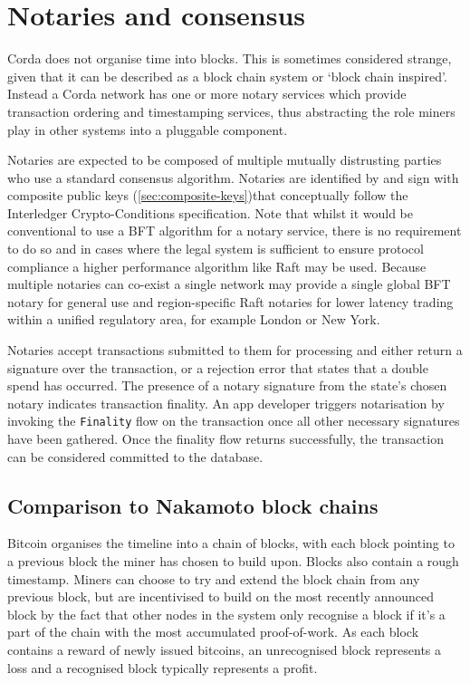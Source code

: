 \documentclass{article}
\begin{document}

\section{Notaries and consensus}\label{sec:notaries}

Corda does not organise time into blocks. This is sometimes considered strange, given that it can be described as a
block chain system or `block chain inspired'. Instead a Corda network has one or more notary services which provide
transaction ordering and timestamping services, thus abstracting the role miners play in other systems into a pluggable
component.

Notaries are expected to be composed of multiple mutually distrusting parties who use a standard consensus algorithm.
Notaries are identified by and sign with composite public keys (\cref{sec:composite-keys})that conceptually follow the
Interledger Crypto-Conditions specification\cite{ILPCC}. Note that whilst it would be conventional to use a BFT
algorithm for a notary service, there is no requirement to do so and in cases where the legal system is sufficient to
ensure protocol compliance a higher performance algorithm like Raft\cite{Ongaro:2014:SUC:2643634.2643666} may be used.
Because multiple notaries can co-exist a single network may provide a single global BFT notary for general use and
region-specific Raft notaries for lower latency trading within a unified regulatory area, for example London or New York.

Notaries accept transactions submitted to them for processing and either return a signature over the transaction, or
a rejection error that states that a double spend has occurred. The presence of a notary signature from the state's
chosen notary indicates transaction finality. An app developer triggers notarisation by invoking the
\texttt{Finality} flow on the transaction once all other necessary signatures have been gathered. Once the finality flow
returns successfully, the transaction can be considered committed to the database.

\subsection{Comparison to Nakamoto block chains}

Bitcoin organises the timeline into a chain of blocks, with each block pointing to a previous block the miner has chosen
to build upon. Blocks also contain a rough timestamp. Miners can choose to try and extend the block chain from any
previous block, but are incentivised to build on the most recently announced block by the fact that other nodes in the
system only recognise a block if it's a part of the chain with the most accumulated proof-of-work. As each block contains
a reward of newly issued bitcoins, an unrecognised block represents a loss and a recognised block typically represents
a profit.
\end{document}
